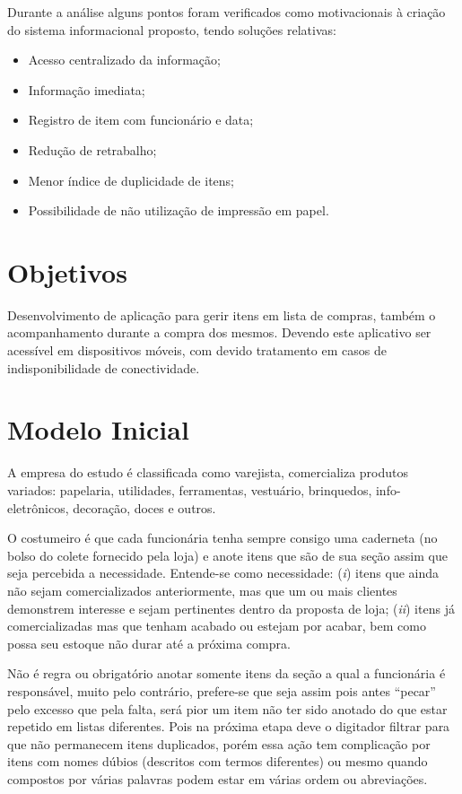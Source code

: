 \documentclass[12pt]{article}
\begin{document}
Durante a análise alguns pontos foram verificados como motivacionais à criação do sistema informacional proposto, tendo soluções relativas:

\begin{itemize}
\item Acesso centralizado da informação;
\item Informação imediata;
\item Registro de item com funcionário e data;
\item Redução de retrabalho;
\item Menor índice de duplicidade de itens;
\item Possibilidade de não utilização de impressão em papel.
\end{itemize}

\section{Objetivos}

Desenvolvimento de aplicação para gerir itens em lista de compras, também o acompanhamento durante a compra dos mesmos. Devendo este aplicativo ser acessível em dispositivos móveis, com devido tratamento em casos de indisponibilidade de conectividade.

\section{Modelo Inicial}

A empresa do estudo é classificada como varejista, comercializa produtos variados: papelaria, utilidades, ferramentas, vestuário, brinquedos, info-eletrônicos, decoração, doces e outros.

O costumeiro é que cada funcionária tenha sempre consigo uma caderneta (no bolso do colete fornecido pela loja) e anote itens que são de sua seção assim que seja percebida a necessidade. Entende-se como necessidade: (\textit{i}) itens que ainda não sejam comercializados anteriormente, mas que um ou mais clientes demonstrem interesse e sejam pertinentes dentro da proposta de loja; (\textit{ii}) itens já comercializadas mas que tenham acabado ou estejam por acabar, bem como possa seu estoque não durar até a próxima compra.

Não é regra ou obrigatório anotar somente itens da seção a qual a funcionária é responsável, muito pelo contrário, prefere-se que seja assim pois antes ``pecar'' pelo excesso que pela falta, será pior um item não ter sido anotado do que estar repetido em listas diferentes. Pois na próxima etapa deve o digitador filtrar para que não permanecem itens duplicados, porém essa ação tem complicação por itens com nomes dúbios (descritos com termos diferentes) ou mesmo quando compostos por várias palavras podem estar em várias ordem ou abreviações.
\end{document}
